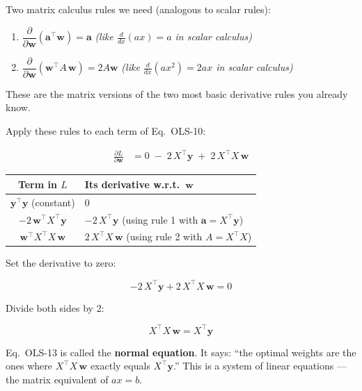 \documentclass[11pt, a4paper]{article}
\newcommand{\gut}[1]{\begin{tcolorbox}[colback=lightyellow, colframe=orange!50, title=Gut feeling]#1\end{tcolorbox}}
\newcommand{\recap}[1]{\begin{tcolorbox}[colback=lightblue, colframe=secblue!50, title=Recap]#1\end{tcolorbox}}
\begin{document}
\recap{
Two matrix calculus rules we need (analogous to scalar rules):
\begin{enumerate}
\item $\dfrac{\partial}{\partial \mathbf{w}} (\mathbf{a}^\top \mathbf{w}) = \mathbf{a}$
\hfill \textit{(like $\frac{d}{dx}(ax) = a$ in scalar calculus)}
\item $\dfrac{\partial}{\partial \mathbf{w}} (\mathbf{w}^\top A \,\mathbf{w}) = 2A\mathbf{w}$
\hfill \textit{(like $\frac{d}{dx}(ax^2) = 2ax$ in scalar calculus)}
\end{enumerate}
These are the matrix versions of the two most basic derivative rules you already know.
}

Apply these rules to each term of Eq.~OLS-10:

\begin{align}
\frac{\partial L}{\partial \mathbf{w}} &= 0 \;-\; 2\,X^\top \mathbf{y} \;+\; 2\,X^\top X\,\mathbf{w}
\tag{OLS-11}
\end{align}

\begin{center}
\begin{tabular}{cl}
\toprule
\textbf{Term in $L$} & \textbf{Its derivative w.r.t.\ $\mathbf{w}$} \\
\midrule
$\mathbf{y}^\top \mathbf{y}$ (constant) & $0$ \\
$-2\,\mathbf{w}^\top X^\top \mathbf{y}$ & $-2\,X^\top \mathbf{y}$ \quad (using rule 1 with $\mathbf{a} = X^\top \mathbf{y}$) \\
$\mathbf{w}^\top X^\top X\, \mathbf{w}$ & $2\,X^\top X\,\mathbf{w}$ \quad (using rule 2 with $A = X^\top X$) \\
\bottomrule
\end{tabular}
\end{center}

Set the derivative to zero:

\begin{equation}
-2\,X^\top \mathbf{y} + 2\,X^\top X\,\mathbf{w} = 0
\tag{OLS-12}
\end{equation}

Divide both sides by 2:

\begin{equation}
X^\top X\,\mathbf{w} = X^\top \mathbf{y}
\tag{OLS-13}
\end{equation}

\gut{
Eq.~OLS-13 is called the \textbf{normal equation}. It says: ``the optimal weights are the ones where $X^\top X \,\mathbf{w}$ exactly equals $X^\top \mathbf{y}$.'' This is a system of linear equations --- the matrix equivalent of $ax = b$.
}
\end{document}
